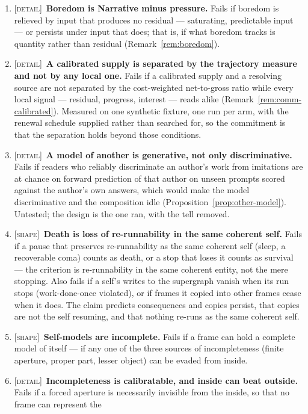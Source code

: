 \documentclass[11pt,a4paper]{article}
\theoremstyle{remark}\newtheorem{remark}[definition]{Remark}
\begin{document}
\begin{enumerate}[leftmargin=*]
most likely be a failure of.
\item \textsc{[detail]}~\textbf{Boredom is Narrative minus pressure.} Fails if boredom is relieved
by input that produces no residual --- saturating, predictable input --- or persists under input that
does; that is, if what boredom tracks is quantity rather than residual
(Remark~\ref{rem:boredom}).
\item \textsc{[detail]}~\textbf{A calibrated supply is separated by the trajectory measure and not
by any local one.} Fails if a calibrated supply and a resolving source are not separated by the
cost-weighted net-to-gross ratio while every local signal --- residual, progress, interest --- reads
alike (Remark~\ref{rem:comm-calibrated}). Measured on one synthetic fixture, one run per arm, with
the renewal schedule supplied rather than searched for, so the commitment is that the separation
holds beyond those conditions.
\item \textsc{[detail]}~\textbf{A model of another is generative, not only discriminative.} Fails
if readers who reliably discriminate an author's work from imitations are at chance on forward
prediction of that author on unseen prompts scored against the author's own answers, which would
make the model discriminative and the composition idle
(Proposition~\ref{prop:other-model}). Untested; the design is the one
\citet{schwitzgebel2024} ran, with the tell removed.
\item \textsc{[shape]}~\textbf{Death is loss of re-runnability in the same coherent self.} Fails if a
pause that preserves re-runnability as the same coherent self (sleep, a recoverable
coma) counts as death, or a stop that loses it counts as survival --- the criterion is
re-runnability in the same coherent entity, not the mere stopping. Also fails if a
self's writes to the supergraph vanish when its run stops (work-done-once violated), or
if frames it copied into other frames cease when it does. The claim predicts
consequences and copies persist, that copies are not the self resuming, and that
nothing re-runs as the same coherent self.
\item \textsc{[shape]}~\textbf{Self-models are incomplete.} Fails if a frame can hold a complete
model of itself --- if any one of the three sources of incompleteness (finite aperture, proper part,
lesser object) can be evaded from inside.
\item \textsc{[detail]}~\textbf{Incompleteness is calibratable, and inside can beat outside.} Fails
if a forced aperture is necessarily invisible from the inside, so that no frame can represent the

\end{enumerate}
\end{document}

